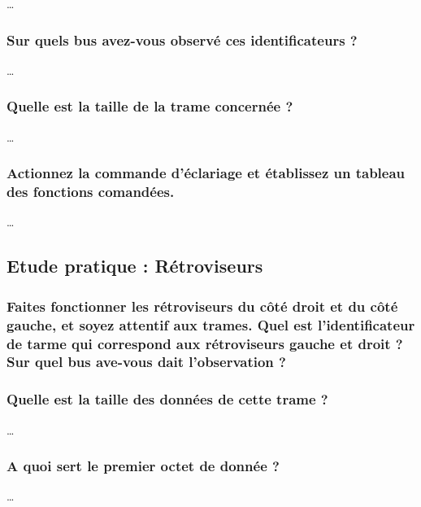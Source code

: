 \documentclass{rapportECC}
\begin{document}
\dots

\subsubsection*{Sur quels bus avez-vous observé ces identificateurs ?}

\dots

\subsubsection*{Quelle est la taille de la trame concernée ?}

\dots

\subsubsection*{Actionnez la commande d'éclariage et établissez un tableau des fonctions comandées.}

\dots


\subsection{Etude pratique : Rétroviseurs}

\subsubsection*{Faites fonctionner les rétroviseurs du côté droit et du côté gauche, et soyez attentif aux trames. Quel est l'identificateur de tarme qui correspond aux rétroviseurs gauche et droit ?  Sur quel bus ave-vous dait l'observation ?}

\subsubsection*{Quelle est la taille des données de cette trame ?}

\dots

\subsubsection*{A quoi sert le premier octet de donnée ?}

\dots
\end{document}
